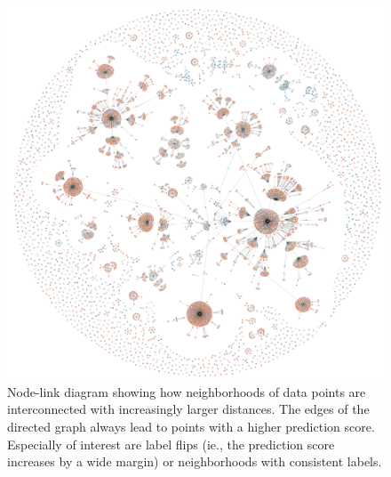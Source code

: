 \begin{figure}[b!]
\centering
\includegraphics[width=0.5\linewidth]{figs/current/graph_d2}
\caption{
Node-link diagram showing how neighborhoods of data points are interconnected
with increasingly larger distances.
The edges of the directed graph always lead to points with a higher prediction score.
Especially of interest are label flips (ie., the prediction score increases by a wide
margin) or neighborhoods with consistent labels.
}
\label{figs:current_graph}
\end{figure}